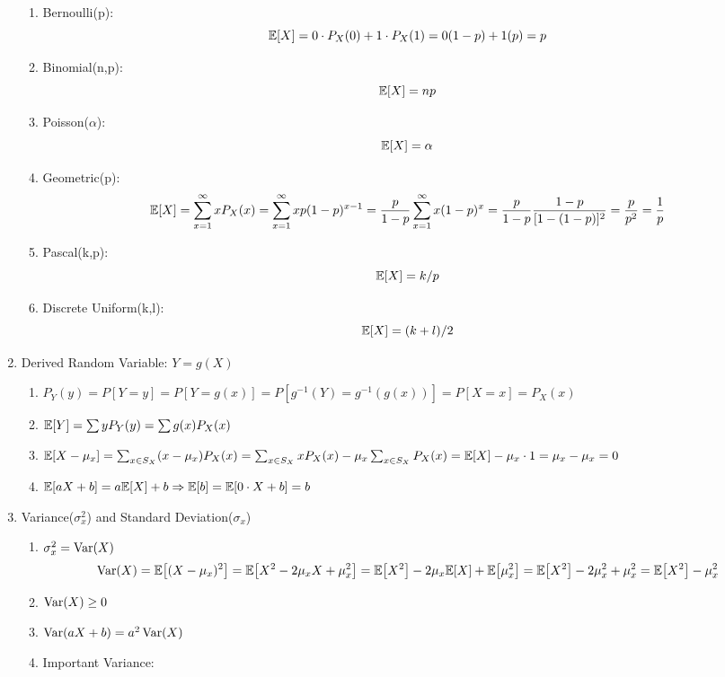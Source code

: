 \begin{enumerate}
{\begin{enumerate}
{\begin{enumerate}
{                        \begin{enumerate}
                            \item Bernoulli(p): $$\E{X}=0\cdot P_X(0)+1\cdot P_X(1)=0(1-p)+1(p)=p$$
                            \item Binomial(n,p): $$\E{X}=np$$
                            \item Poisson($\alpha$): $$\E{X}=\alpha$$
                            \item Geometric(p): $$\E{X}=\sum_{x=1}^{\infty}xP_X(x)=\sum_{x=1}^{\infty}xp(1-p)^{x-1}=\dfrac{p}{1-p}\sum_{x=1}^{\infty}x(1-p)^x=\dfrac{p}{1-p}\dfrac{1-p}{[1-(1-p)]^2}=\dfrac{p}{p^2}=\dfrac{1}{p}$$
                            \item Pascal(k,p): $$\E{X}=k/p$$
                            \item Discrete Uniform(k,l): $$\E{X}=(k+l)/2$$
                        \end{enumerate}
                    }
                \end{enumerate}
            }
        \end{enumerate}
    }
    \item Derived Random Variable: $Y = g(X)${
        \begin{enumerate}
            \item $P_Y(y) = P[Y=y] = P[Y=g(x)] = P[g^{-1}(Y)=g^{-1}(g(x))] = P[X=x] = P_X(x)$
            \item $\E{Y} = \sum yP_Y(y) = \sum g(x)P_X(x)$
            \item $\E{X-\mu_x}=\sum_{x\in S_X}(x-\mu_x)P_X(x)=\sum_{x\in S_X}xP_X(x)-\mu_x\sum_{x\in S_X}P_X(x)=\E{X}-\mu_x\cdot 1=\mu_x-\mu_x=0$
            \item $\E{aX+b}=a\E{X}+b \Rightarrow \E{b}=\E{0\cdot X+b}=b$
        \end{enumerate}
    }
    \item Variance($\sigma_x^2$) and Standard Deviation($\sigma_x$){
        \begin{enumerate}
            \item $\sigma_x^2=\mathop{\mathrm{Var}}\nolimits(X)$ $$\Var(X)=\E{(X-\mu_x)^2}=\E{X^2-2\mu_xX+\mu_x^2}=\E{X^2}-2\mu_x\E{X}+\E{\mu_x^2}=\E{X^2}-2\mu_x^2+\mu_x^2=\E{X^2}-\mu_x^2$$
            \item $\mathop{\mathrm{Var}}\nolimits(X)\geq 0$
            \item $\mathop{\mathrm{Var}}\nolimits(aX+b)=a^2\mathop{\mathrm{Var}}\nolimits(X)$
            \item Important Variance:{
                \begin{enumerate}

\end{enumerate}}
\end{enumerate}}
\end{enumerate}
